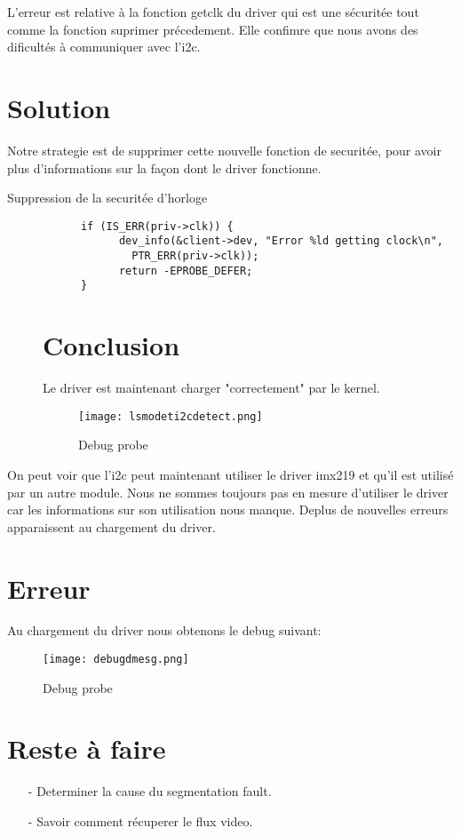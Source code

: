L'erreur est relative à la fonction getclk du driver qui est une sécuritée tout comme la fonction suprimer précedement.
Elle confimre que nous avons des dificultés à communiquer avec l'i2c.

\section{Solution}
Notre strategie est de supprimer cette nouvelle fonction de securitée, pour avoir plus
d'informations sur la façon dont le driver fonctionne.
\begin{description}
  \item[Suppression de la securitée d'horloge]
    \begin{lstlisting}
	  if (IS_ERR(priv->clk)) {
		    dev_info(&client->dev, "Error %ld getting clock\n",
			  PTR_ERR(priv->clk));
		    return -EPROBE_DEFER;
	  }
    \end{lstlisting}
\section{Conclusion}
Le driver est maintenant charger "correctement" par le kernel.

\begin{figure}[th]
  \centering
  \texttt{[image: lsmodeti2cdetect.png]}
  \decoRule
  \caption{Debug probe}  \label{fig:planning}
\end{figure}

    \clearpage
  \end{description}

  On peut voir que l'i2c peut maintenant utiliser le driver imx219 et 
  qu'il est utilisé par un autre module. Nous ne sommes toujours pas en mesure
  d'utiliser le driver car les informations sur son utilisation nous manque.
  Deplus de nouvelles erreurs apparaissent au chargement du driver.

  \section{Erreur}
  Au chargement du driver nous obtenons le debug suivant:
  
  \begin{figure}[th]
    \centering
    \texttt{[image: debugdmesg.png]}
    \decoRule
    \caption{Debug probe}  \label{fig:planning}
  \end{figure}

  \section{Reste à faire}

  \begin{itemize}
  \item[-] Determiner la cause du segmentation fault.
  \item[-] Savoir comment récuperer le flux video.
  \end{itemize}
